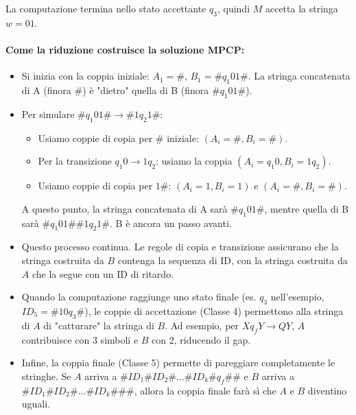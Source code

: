 \documentclass[a4paper]{article}
\theoremstyle{definition} %
\theoremstyle{remark} %
\begin{document}
La computazione termina nello stato accettante $q_3$, quindi $M$ accetta la stringa $w = 01$.

\paragraph{Come la riduzione costruisce la soluzione MPCP:}
\begin{itemize}
    \item Si inizia con la coppia iniziale: $A_1 = \#$, $B_1 = \#q_1 01\#$.
        La stringa concatenata di A (finora $\#$) è "dietro" quella di B (finora $\#q_1 01\#$).
    \item Per simulare $\#q_1 01\# \to \#1q_2 1\#$:
        \begin{itemize}
            \item Usiamo coppie di copia per $\#$ iniziale: $(A_i = \#, B_i = \#)$.
            \item Per la transizione $q_1 0 \to 1q_2$: usiamo la coppia $(A_i = q_1 0, B_i = 1q_2)$.
            \item Usiamo coppie di copia per $1\#$: $(A_i=1, B_i=1)$ e $(A_i=\#, B_i=\#)$.
        \end{itemize}
        A questo punto, la stringa concatenata di A sarà $\#q_1 01\#$, mentre quella di B sarà $\#q_1 01\# \#1q_2 1\#$. B è ancora un passo avanti.
    \item Questo processo continua. Le regole di copia e transizione assicurano che la stringa costruita da $B$ contenga la sequenza di ID, con la stringa costruita da $A$ che la segue con un ID di ritardo.
    \item Quando la computazione raggiunge uno stato finale (es. $q_3$ nell'esempio, $ID_5 = \#10q_3\#$), le coppie di accettazione (Classe 4) permettono alla stringa di $A$ di "catturare" la stringa di $B$. Ad esempio, per $Xq_f Y \to QY$, $A$ contribuisce con 3 simboli e $B$ con 2, riducendo il gap.
    \item Infine, la coppia finale (Classe 5) permette di pareggiare completamente le stringhe. Se $A$ arriva a $\#ID_1\#ID_2\# \dots \#ID_k \#q_f \# \#$ e $B$ arriva a $\#ID_1\#ID_2\# \dots \#ID_k \# \# \#$, allora la coppia finale farà sì che $A$ e $B$ diventino uguali.
\end{itemize}
\end{document}
